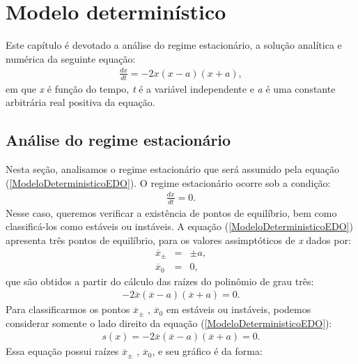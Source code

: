 \chapter{Modelo determinístico}
Este capítulo é devotado a análise do regime estacionário, a solução analítica e numérica da seguinte equação:
\begin{eqnarray}\label{ModeloDeterministicoEDO}
\frac{dx}{dt} = -2x(x-a)(x+a) ,
\end{eqnarray}
em que \textit{x} é função do tempo, \textit{t} é a variável independente e 
\textit{a} é uma constante arbitrária real positiva da equação.

\section{Análise do regime estacionário} 
Nesta seção, analisamos o regime estacionário que será assumido pela equação (\ref{ModeloDeterministicoEDO}). O regime estacionário ocorre sob a condição:
\begin{eqnarray}\label{eq1}
\frac{dx}{dt} = 0.
\end{eqnarray}
Nesse caso, queremos verificar a existência de pontos de equilíbrio, bem como classificá-los como estáveis ou instáveis.
A equação (\ref{ModeloDeterministicoEDO}) apresenta três pontos de equilíbrio, para os valores assimptóticos de \textit{x} dados por:
\begin{eqnarray}
\overline{x}_{\pm} &=& \pm a , \\
\overline{x}_{0} &=& 0 ,
\end{eqnarray}
que são obtidos a partir do cálculo das raízes do polinômio de grau três:
\begin{eqnarray}\label{eq111}
-2 \overline{x}(\overline{x} - a)(\overline{x} + a) = 0.
\end{eqnarray}
Para classificarmos os pontos $\overline{x}_{\pm}$ , $\overline{x}_{0}$ em estáveis ou instáveis, podemos considerar somente o lado direito da equação (\ref{ModeloDeterministicoEDO}):
\begin{eqnarray}
s(x) = -2 \overline{x}(\overline{x} - a)(\overline{x} + a) = 0.
\end{eqnarray}
Essa equação possui raízes $\overline{x}_{\pm}$ , $\overline{x}_{0}$, e seu gráfico é da forma:
